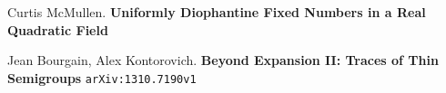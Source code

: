 \documentclass[12pt]{article}
\begin{document}
\newpage

\selectfont \fontsize{12}{10}\selectfont

\begin{thebibliography}{}

\item Curtis McMullen.  \textbf{Uniformly Diophantine Fixed Numbers in a Real Quadratic Field}

\item Jean Bourgain, Alex Kontorovich.
\textbf{Beyond Expansion II: Traces of Thin Semigroups} \texttt{arXiv:1310.7190v1}

\end{thebibliography}
\end{document}
